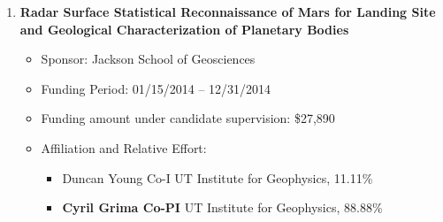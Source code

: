 \begin{enumerate}[leftmargin=2.5em, labelsep=1.5em, label=E\arabic*]
    \item
        \textbf{Radar Surface Statistical Reconnaissance of Mars for Landing Site and Geological Characterization of Planetary Bodies}
        \begin{itemize}[leftmargin=0em, labelsep=1em, topsep=-.5em, itemsep=-.2em]
            \item Sponsor: Jackson School of Geosciences
            \item Funding Period: 01/15/2014 – 12/31/2014
            \item Funding amount under candidate supervision: \$27,890
            \item Affiliation and Relative Effort:
            \TabPositions{4cm, 5.5cm}
            \begin{itemize}[leftmargin=2em, labelsep=1em, topsep=-.5em, itemsep=-.2em]
                \item Duncan Young \tab Co-I \tab  UT Institute for Geophysics, 11.11\%
                \item \textbf{Cyril Grima \tab Co-PI} \tab  UT Institute for Geophysics, 88.88\%
            \end{itemize}
        \end{itemize}

\end{enumerate}

